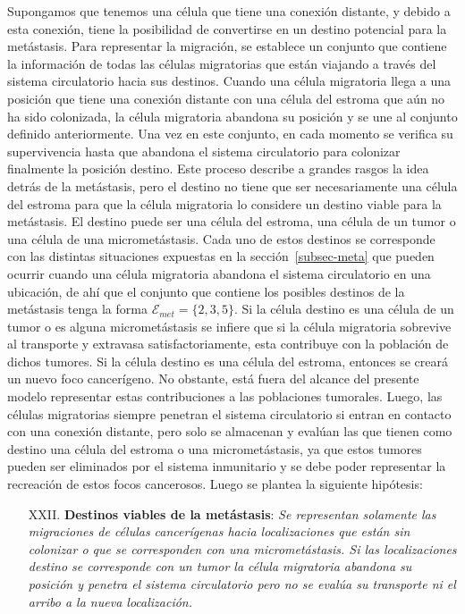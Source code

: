Supongamos que tenemos una célula que tiene una conexión distante, y debido a esta conexión, tiene la posibilidad de convertirse en un destino potencial para la metástasis. Para representar la migración, se establece un conjunto que contiene la información de todas las células migratorias que están viajando a través del sistema circulatorio hacia sus destinos. Cuando una célula migratoria llega a una posición que tiene una conexión distante con una célula del estroma que aún no ha sido colonizada, la célula migratoria abandona su posición y se une al conjunto definido anteriormente. Una vez en este conjunto, en cada momento se verifica su supervivencia hasta que abandona el sistema circulatorio para colonizar finalmente la posición destino. Este proceso describe a grandes rasgos la idea detrás de la metástasis, pero el destino no tiene que ser necesariamente una célula del estroma para que la célula migratoria lo considere un destino viable para la metástasis. El destino puede ser una célula del estroma, una célula de un tumor o una célula de una micrometástasis. Cada uno de estos destinos se corresponde con las distintas situaciones expuestas en la secci\'on~\ref{subsec-meta} que pueden ocurrir cuando una célula migratoria abandona el sistema circulatorio en una ubicación, de ah\'i que el conjunto que contiene los posibles destinos de la met\'astasis tenga la forma ${\mathcal{E}_{met}}=\lbrace 2,3,5 \rbrace$. Si la c\'elula destino es una c\'elula de un tumor o es alguna micromet\'astasis se infiere que si la c\'elula migratoria sobrevive al transporte y extravasa satisfactoriamente, esta contribuye con la poblaci\'on de dichos tumores. Si la c\'elula destino es una c\'elula del estroma, entonces se crear\'a un nuevo foco cancer\'igeno. No obstante, est\'a fuera del alcance del presente modelo representar estas contribuciones a las poblaciones tumorales. Luego, las c\'elulas migratorias siempre penetran el sistema circulatorio si entran en contacto con una conexi\'on distante, pero solo se almacenan y eval\'uan las que tienen como destino una c\'elula del estroma o una micromet\'astasis, ya que estos tumores pueden ser eliminados por el sistema inmunitario y se debe poder representar la recreaci\'on de estos focos cancerosos. Luego se plantea la siguiente hip\'otesis: 

\begin{itemize}
\item [XXII.] \textbf{Destinos viables de la met\'astasis}: \emph{Se representan solamente las migraciones de c\'elulas cancer\'igenas hacia localizaciones que est\'an sin colonizar o que se corresponden con una micromet\'astasis. Si las localizaciones destino se corresponde con un tumor la c\'elula migratoria abandona su posici\'on y penetra el sistema circulatorio pero no se eval\'ua su transporte ni el arribo a la nueva localizaci\'on.} \label{XXII}
\end{itemize}

